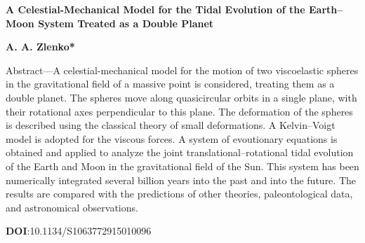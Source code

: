 \documentclass[12pt]{article}
\begin{document}
\thispagestyle{fancy}
\renewcommand{\headrulewidth}{1pt}

\renewcommand{\footrulewidth}{0.4pt}


\makeatletter
\def\headrule{{\if@fancyplain\let\headrulewidth\plainheadrulewidth\fi
\hrule\@height\headrulewidth\@width\headwidth
\vskip 2pt%
\hrule\@height.5pt\@width\headwidth%
\vskip-\headrulewidth
\vskip-1.5pt}}
\makeatother

\textbf{A Celestial-Mechanical Model for the Tidal Evolution
of the Earth–Moon System Treated as a Double Planet}
\begin{center}
\textbf{A. A. Zlenko*}
\end{center}
\begin{center}
Abstract—A celestial-mechanical model for the motion of two viscoelastic spheres in the gravitational
field of a massive point is considered, treating them as a double planet. The spheres move along quasicircular
orbits in a single plane, with their rotational axes perpendicular to this plane. The deformation of
the spheres is described using the classical theory of small deformations. A Kelvin–Voigt model is adopted
for the viscous forces. A system of evoutionary equations is obtained and applied to analyze the joint
translational–rotational tidal evolution of the Earth and Moon in the gravitational field of the Sun. This
system has been numerically integrated several billion years into the past and into the future. The results
are compared with the predictions of other theories, paleontological data, and astronomical observations.
\end{center}

\textbf{DOI}:10.1134/S1063772915010096
\end{document}
